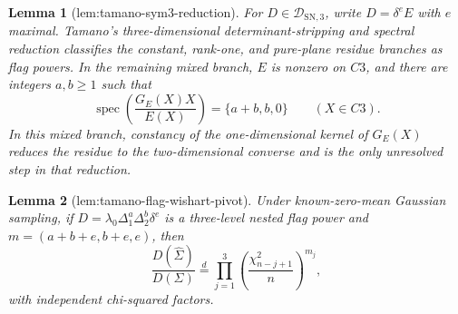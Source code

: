\documentclass{article}
\newtheorem{lemma}{Lemma}
\begin{document}
\begin{lemma}[lem:tamano-sym3-reduction]\label{lem:tamano-sym3-reduction}
For \(D\in\mathcal D_{\mathrm{SN},3}\), write \(D=\delta^eE\) with \(e\) maximal.  Tamano's three-dimensional determinant-stripping and spectral reduction classifies the constant, rank-one, and pure-plane residue branches as flag powers.  In the remaining mixed branch, \(E\) is nonzero on \(C3\), and there are integers \(a,b\geq1\) such that
\[
 \operatorname{spec}\!\left(\frac{G_E(X)X}{E(X)}\right)=\{a+b,b,0\}
 \qquad(X\in C3).
\]
In this mixed branch, constancy of the one-dimensional kernel of \(G_E(X)\) reduces the residue to the two-dimensional converse and is the only unresolved step in that reduction.
\end{lemma}

\begin{lemma}[lem:tamano-flag-wishart-pivot]\label{lem:tamano-flag-wishart-pivot}
Under known-zero-mean Gaussian sampling, if \(D=\lambda_0\Delta_1^a\Delta_2^b\delta^e\) is a three-level nested flag power and \(m=(a+b+e,b+e,e)\), then
\[
 \frac{D(\widehat\Sigma)}{D(\Sigma)}
 \stackrel{d}{=}
 \prod_{j=1}^{3}
 \left(\frac{\chi^2_{n-j+1}}{n}\right)^{m_j},
\]
with independent chi-squared factors.
\end{lemma}
\end{document}
